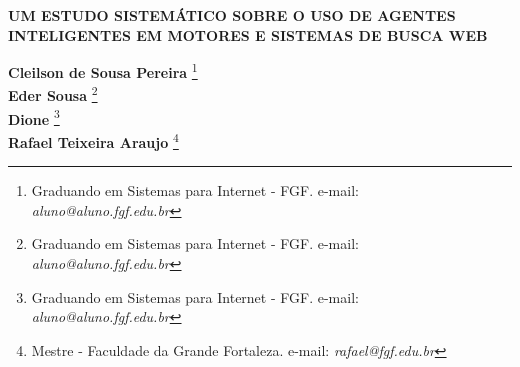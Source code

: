 \documentclass[12pt]{article}
\begin{document}

%



\begin{center}
\textbf{\Large{UM ESTUDO SISTEMÁTICO SOBRE O USO DE AGENTES INTELIGENTES EM MOTORES E SISTEMAS DE BUSCA WEB}}\\
\end{center}

\vspace*{0.2cm}

\begin{flushright}
 {\bf Cleilson de Sousa Pereira} \footnote[1]{Graduando em Sistemas para Internet - FGF. e-mail: \it aluno@aluno.fgf.edu.br}  \\
 {\bf Eder Sousa} \footnote[2]{Graduando em Sistemas para Internet - FGF. e-mail: \it aluno@aluno.fgf.edu.br}  \\
  {\bf Dione} \footnote[3]{Graduando em Sistemas para Internet - FGF. e-mail: \it aluno@aluno.fgf.edu.br}  \\
   {\bf Rafael Teixeira Araujo} \footnote[4]{Mestre - Faculdade da Grande Fortaleza. e-mail: \it rafael@fgf.edu.br}   \\
\end{flushright}

\vspace*{0.5cm}

\end{document}
